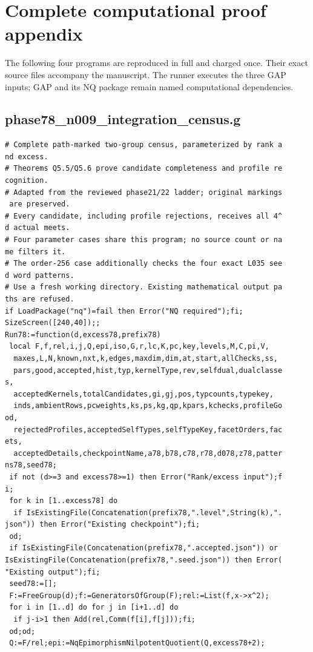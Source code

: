 \documentclass[
  11pt,
  a4paper,
]{article}
\begin{document}
\section{Complete computational proof
appendix}\label{complete-computational-proof-appendix}

The following four programs are reproduced in full and charged once.
Their exact source files accompany the manuscript. The runner executes
the three GAP inputs; GAP and its NQ package remain named computational
dependencies.

\subsection{phase78\_n009\_integration\_census.g}\label{phase78_n009_integration_census.g}

\begin{verbatim}
# Complete path-marked two-group census, parameterized by rank a
nd excess.
# Theorems Q5.5/Q5.6 prove candidate completeness and profile re
cognition.
# Adapted from the reviewed phase21/22 ladder; original markings
 are preserved.
# Every candidate, including profile rejections, receives all 4^
d actual meets.
# Four parameter cases share this program; no source count or na
me filters it.
# The order-256 case additionally checks the four exact L035 see
d word patterns.
# Use a fresh working directory. Existing mathematical output pa
ths are refused.
if LoadPackage("nq")=fail then Error("NQ required");fi;
SizeScreen([240,40]);;
Run78:=function(d,excess78,prefix78)
 local F,f,rel,i,j,Q,epi,iso,G,r,lc,K,pc,key,levels,M,C,pi,V,
  maxes,L,N,known,nxt,k,edges,maxdim,dim,at,start,allChecks,ss,
  pars,good,accepted,hist,typ,kernelType,rev,selfdual,dualclasse
s,
  acceptedKernels,totalCandidates,gi,gj,pos,typcounts,typekey,
  inds,ambientRows,pcweights,ks,ps,kg,qp,kpars,kchecks,profileGo
od,
  rejectedProfiles,acceptedSelfTypes,selfTypeKey,facetOrders,fac
ets,
  acceptedDetails,checkpointName,a78,b78,c78,r78,d078,z78,patter
ns78,seed78;
 if not (d>=3 and excess78>=1) then Error("Rank/excess input");f
i;
 for k in [1..excess78] do
  if IsExistingFile(Concatenation(prefix78,".level",String(k),".
json")) then Error("Existing checkpoint");fi;
 od;
 if IsExistingFile(Concatenation(prefix78,".accepted.json")) or 
IsExistingFile(Concatenation(prefix78,".seed.json")) then Error(
"Existing output");fi;
 seed78:=[];
 F:=FreeGroup(d);f:=GeneratorsOfGroup(F);rel:=List(f,x->x^2);
 for i in [1..d] do for j in [i+1..d] do
  if j-i>1 then Add(rel,Comm(f[i],f[j]));fi;
 od;od;
 Q:=F/rel;epi:=NqEpimorphismNilpotentQuotient(Q,excess78+2);

\end{verbatim}
\end{document}
